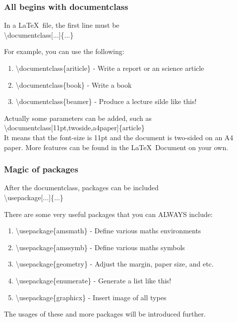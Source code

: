 \documentclass{beamer}
\begin{document}
\begin{frame}
	\frametitle{All begins with documentclass}
	\begin{definition}
		In a \LaTeX\ file, the {\color{blue}first} line must be \\
		{\color{red}\textbackslash documentclass[...]\{...\}}	
	\end{definition}
	For example, you can use the following:\\
	\begin{enumerate}
		\item {\color{red}\textbackslash documentclass\{ariticle\}} - Write a report or an science article
		\item {\color{red}\textbackslash documentclass\{book\}} - Write a book
		\item {\color{red}\textbackslash documentclass\{beamer\}} - Produce a lecture silde like this!
	\end{enumerate}
	Actually some parameters can be added, such as\\
	{\color{red}\textbackslash documentclass[11pt,twoside,a4paper]\{article\}}\\
	It means that the font-size is 11pt and the document is two-sided on an A4 paper. More features can be found in the \LaTeX\ Document on your own.
\end{frame}

\begin{frame}
	\frametitle{Magic of packages}
	\begin{definition}
		After the {\color{blue}documentclass}, packages can be included\\
		{\color{red}\textbackslash usepackage[...]\{...\}}	
	\end{definition}
	There are some very useful packages that you can {\color{blue}ALWAYS} include:
	\begin{enumerate}
		\item {\color{red}\textbackslash usepackage\{amsmath\}} - Define various maths environments
		\item {\color{red}\textbackslash usepackage\{amssymb\}} - Define various maths symbols
		\item {\color{red}\textbackslash usepackage\{geometry\}} - Adjust the margin, paper size, and etc.
		\item {\color{red}\textbackslash usepackage\{enumerate\}} - Generate a list like this!
		\item {\color{red}\textbackslash usepackage\{graphicx\}} - Insert image of all types
	\end{enumerate}
	The usages of these and more packages will be introduced further.
\end{frame}
\end{document}
